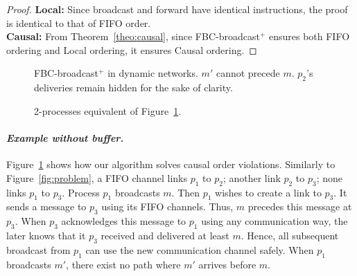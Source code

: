 \begin{proof}
  \textbf{Local:} Since broadcast and forward have identical instructions, the
  proof is identical to that of FIFO order. \\
  \textbf{Causal:} From Theorem~\ref{theo:causal}, since FBC-broadcast$^+$
  ensures both FIFO ordering and Local ordering, it ensures Causal ordering.
\end{proof}

\begin{figure}
  \begin{center}
    
    \caption{\label{fig:solved}FBC-broadcast$^+$ in dynamic networks. $m'$
      cannot precede $m$. $p_2$'s deliveries remain hidden for the sake of
      clarity.}
  \end{center}
\end{figure}

\begin{figure}
  \begin{center}
    
    \caption{\label{fig:eq2solved}2-processes equivalent of Figure~\ref{fig:solved}.}
  \end{center}
\end{figure}

\paragraph{\emph{Example without buffer.}} Figure~\ref{fig:solved} shows how our
algorithm solves causal order violations. Similarly to Figure~\ref{fig:problem},
a FIFO channel links $p_1$ to $p_2$; another link $p_2$ to $p_3$; none links
$p_1$ to $p_3$. Process $p_1$ broadcasts $m$. Then $p_1$ wishes to create a link
to $p_3$. It sends a message to $p_3$ using its FIFO channels. Thus, $m$
precedes this message at $p_3$. When $p_3$ acknowledges this message to $p_1$
using any communication way, the later knows that it $p_3$ received and
delivered at least $m$. Hence, all subsequent broadcast from $p_1$ can use the
new communication channel safely. When $p_1$ broadcasts $m'$, there exist no
path where $m'$ arrives before $m$.

